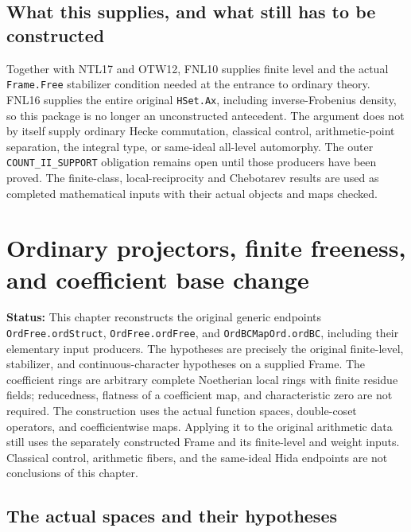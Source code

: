 \documentclass[11pt,a4paper]{article}
\numberwithin{equation}{section}
\theoremstyle{remark}\newtheorem{remark}[theorem]{Remark}
\newcommand{\status}[1]{\textbf{Status:} #1}
\begin{document}
\subsection{What this supplies, and what still has to be constructed}

Together with NTL17 and OTW12, FNL10 supplies finite level and the actual
\texttt{Frame.\allowbreak Free} stabilizer condition needed at the entrance to
ordinary theory.  FNL16 supplies the entire original
\texttt{HSet.\allowbreak Ax}, including inverse-Frobenius density, so this package
is no longer an unconstructed antecedent.  The argument does not by
itself supply ordinary Hecke commutation, classical control,
arithmetic-point separation, the integral type, or same-ideal all-level
automorphy.  The outer \texttt{COUNT\_\allowbreak II\_\allowbreak SUPPORT} obligation remains
open until those producers have been proved.  The finite-class,
local-reciprocity and Chebotarev results are used as completed
mathematical inputs with their actual objects and maps checked.


\section{Ordinary projectors, finite freeness, and coefficient base change}
\label{sec:ordinary-structure-v42}

\status{This chapter reconstructs the original generic endpoints
\texttt{Ord\allowbreak Free.\allowbreak ord\allowbreak Struct}, \texttt{Ord\allowbreak Free.\allowbreak ord\allowbreak Free}, and
\texttt{Ord\allowbreak BCMap\allowbreak Ord.\allowbreak ord\allowbreak BC}, including their elementary input producers.
The hypotheses are precisely the original finite-level, stabilizer, and
continuous-character hypotheses on a supplied Frame.  The coefficient
rings are arbitrary complete Noetherian local rings with finite residue
fields; reducedness, flatness of a coefficient map, and characteristic
zero are not required.  The construction uses the actual function spaces,
double-coset operators, and coefficientwise maps.  Applying it to the
original arithmetic data still uses the separately constructed Frame and
its finite-level and weight inputs.  Classical control, arithmetic fibers,
and the same-ideal Hida endpoints are not conclusions of this chapter.}

\subsection{The actual spaces and their hypotheses}
\end{document}
